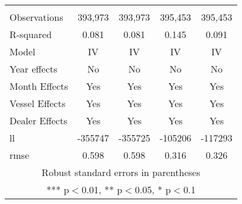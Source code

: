 \begin{tabular}{lcccc}
 &  &  &  &  \\
Observations & 393,973 & 393,973 & 395,453 & 395,453 \\
R-squared & 0.081 & 0.081 & 0.145 & 0.091 \\
Model & IV & IV & IV & IV \\
Year effects & No & No & No & No \\
Month Effects & Yes & Yes & Yes & Yes \\
Vessel Effects & Yes & Yes & Yes & Yes \\
Dealer Effects & Yes & Yes & Yes & Yes \\
ll & -355747 & -355725 & -105206 & -117293 \\
 rmse & 0.598 & 0.598 & 0.316 & 0.326 \\ \hline
\multicolumn{5}{c}{ Robust standard errors in parentheses} \\
\multicolumn{5}{c}{ *** p$<$0.01, ** p$<$0.05, * p$<$0.1} \\
\end{tabular}
